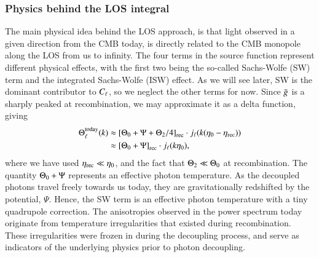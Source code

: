 \subsubsection{Physics behind the LOS integral} \label{sssec:M4:theory:physics_behind_the_LOS_integral}
The main physical idea behind the LOS approach, is that light observed in a given direction from the CMB today, is directly related to the CMB monopole along the LOS from us to infinity. The four terms in the source function represent different physical effects, with the first two being the so-called Sachs-Wolfe (SW) term and the integrated Sachs-Wolfe (ISW) effect. As we will see later, SW is the dominant contributor to $C_\ell$, so we neglect the other terms for now. Since $\tilde{g}$ is a sharply peaked at recombination, we may approximate it as a delta function, giving 
\begin{equation} \label{eq:M4:theory:Theta_ell_today_SW_approximation}
    \begin{split}
        \Theta_\ell^\mathrm{today}(k)&\approx \left[ \Theta_0 + \Psi + \Theta_2/4 \right]_\mathrm{rec}\cdot j_\ell(k(\eta_0-\eta_\mathrm{rec})) \\ 
        &\approx\left[ \Theta_0 + \Psi \right]_\mathrm{rec}\cdot j_\ell(k\eta_0) , 
    \end{split}
\end{equation}
where we have used $\eta_\mathrm{rec}\ll\eta_0$, and the fact that $\Theta_2\ll\Theta_0$ at recombination. The quantity $\Theta_0+\Psi$ represents an effective photon temperature. As the decoupled photons travel freely towards us today, they are gravitationally redshifted by the potential, $\Psi$. Hence, the SW term is an effective photon temperature with a tiny quadrupole correction. The anisotropies observed in the power spectrum today originate from temperature irregularities that existed during recombination. These irregularities were frozen in during the decoupling process, and serve as indicators of the underlying physics prior to photon decoupling.

